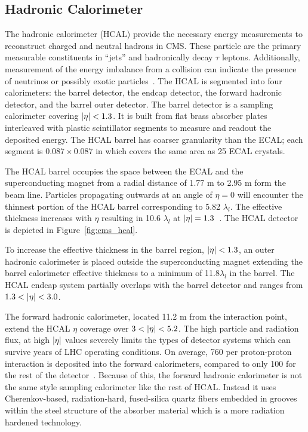 \subsection{Hadronic Calorimeter}
The hadronic calorimeter (HCAL) provide the necessary energy measurements
to reconstruct charged and neutral hadrons in CMS. These particle are the
primary measurable constituents in ``jets'' and hadronically decay $\tau$
leptons. Additionally, measurement of the energy imbalance from a collision
can indicate the presence of neutrinos or possibly exotic particles~\cite{CMS-Proposal}.
The HCAL is segmented into four calorimeters: the barrel detector, the endcap detector,
the forward hadronic detector, and the barrel outer detector. 
The barrel detector is a sampling calorimeter covering $\lvert\eta\rvert < 1.3$. It is built
from flat brass absorber plates interleaved with plastic scintillator segments to
measure and readout the deposited energy. The HCAL barrel has coarser granularity
than the ECAL; each segment is $0.087 \times 0.087$ in \etaphi which covers the
same area as 25 ECAL crystals.

The HCAL barrel occupies the space between the ECAL and the superconducting magnet
from a radial distance of 1.77 m to 2.95 m form the beam line. Particles propagating
outwards at an angle of $\eta = 0$ will encounter the thinnest portion of the
HCAL barrel corresponding to 5.82 $\lambda_{l}$. The effective thickness increases
with $\eta$ resulting in 10.6 $\lambda_{l}$ at $\lvert\eta\rvert = 1.3$~\cite{Chatrchyan:2008zzk}.
The HCAL detector is depicted in Figure~\ref{fig:cms_hcal}.

To increase the effective
thickness in the barrel region, $\lvert\eta\rvert < 1.3$, an outer hadronic calorimeter is placed 
outside the superconducting magnet extending the barrel calorimeter
effective thickness to a minimum of 11.8$\lambda_{l}$ in the barrel. 
The HCAL endcap system partially overlaps with the barrel detector and ranges from
$1.3 < \lvert\eta\rvert < 3.0$.

The forward hadronic calorimeter, located
11.2 m from the interaction point, extend the HCAL $\eta$ coverage over $3 < \lvert\eta\rvert < 5.2$.
The high particle and radiation flux, at high $\lvert\eta\rvert$ values
severely limits the types of detector systems which can survive years of LHC operating
conditions. On average, 760 \GeV per proton-proton interaction is deposited into the forward 
calorimeters, compared to only 100 \GeV for the rest of the detector~\cite{Chatrchyan:2008zzk}.
Because of this, the forward hadronic calorimeter is not the same style sampling
calorimeter like the rest of HCAL. Instead it uses Cherenkov-based, 
radiation-hard, fused-silica quartz fibers embedded in grooves within the steel structure
of the absorber material which is a more radiation hardened technology.

